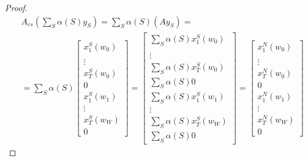 \documentclass[sigconf, table]{acmart}
\newcommand{\acs}{A_{cs}}
\begin{document}
\begin{proof}
\begin{equation}\label{eq:stoc_proof_2}
\begin{aligned}
    &\acs \left(\sum_S \alpha(S) y_S \right) = \sum_S \alpha(S) \left( Ay_S \right) = \\ &= \sum_S \alpha(S) \begin{bmatrix} x^S_1(w_0) \\ \\ \vdots \\ x^S_T(w_0) \\ 0 \\ x^S_1(w_1)\\ \vdots \\ x^S_T(w_W) \\ 0 \end{bmatrix} = \begin{bmatrix} \sum_S \alpha(S) x^S_1(w_0) \\ \\ \vdots \\  \sum_S \alpha(S) x^S_T(w_0) \\ \sum_S \alpha(S) 0 \\ \sum_S \alpha(S) x^S_1(w_1)\\ \vdots \\ \sum_S \alpha(S) x^S_T(w_W) \\ \sum_S \alpha(S) 0 \end{bmatrix} = \begin{bmatrix} x^N_1(w_0) \\ \\ \vdots \\ x^N_T(w_0) \\ 0 \\ x^N_1(w_1)\\ \vdots \\ x^N_T(w_W) \\ 0 \end{bmatrix}
\end{aligned}
\end{equation} 
\end{proof}
\end{document}
